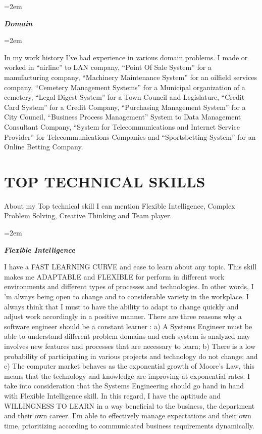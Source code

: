 \documentclass[paper=a4,fontsize=11pt]{scrartcl} %
\newlength{\spacebox}
\newcommand{\sepspace}{\vspace*{1em}}		%
\newcommand{\NewPart}[1]{\section*{\uppercase{#1}}}
\newcommand{\PersonalEntry}[2]{
		\noindent\hangindent=2em\hangafter=0 %
		\parbox{\spacebox}{        %
		\textit{#1}}		       %
		\hspace{1.5em} #2 \par}    %
\newcommand{\SkillsEntry}[2]{      %
		\noindent\hangindent=2em\hangafter=0 %
		\parbox{\spacebox}{        %
		\textit{#1}}			   %
		\hspace{1.5em} #2 \par}    %
\begin{document}
\sepspace

\SkillsEntry{\large{\textbf{Domain}}}{}
\SkillsEntry{}{
	In my work history I've had experience in various domain problems. I made or worked in “airline” to LAN company, “Point Of Sale System” for a manufacturing company, “Machinery Maintenance System” for an oilfield services company, “Cemetery Management Systems” for a Municipal organization of a cemetery, “Legal Digest System” for a Town Council and Legislature, “Credit Card System” for a Credit Company, “Purchasing Management System” for a City Council,  “Business Process Management” System to Data Management Consultant Company, “System for Telecommunications and Internet Service Provider” for Telecommunications Companies and “Sportsbetting System” for an Online Betting Company.
}

\NewPart{Top Technical Skills}{
About my Top technical skill I can mention Flexible Intelligence, Complex Problem Solving, Creative Thinking and Team player.
}

\sepspace

\SkillsEntry{\large{\textbf{Flexible Intelligence}}}{
I have a FAST LEARNING CURVE and ease to learn about any topic. This skill makes me ADAPTABLE and FLEXIBLE for perform in different work environments and different types of processes and technologies. In other words, I 'm always being open to change and to considerable variety in the workplace. I always think that I must to have the ability to adapt to change quickly and adjust work accordingly in a positive manner. There are three reasons why a software engineer should be a constant learner : a) A Systems Engineer must be able to understand different problem domains and each system is analyzed may involves new features and processes that are necessary to learn;  b) There is a low probability of participating in various projects and technology do not change; and c) The computer market behaves as the exponential growth of Moore's Law, this means that the technology and knowledge are improving at exponential rates. I take into consideration that the Systems Engineering should go hand in hand with Flexible Intelligence skill. In this regard, I have the aptitude and WILLINGNESS TO LEARN in a way beneficial to the business, the department and their own career. I'm able to effectively manage expectations and their own time, prioritizing according to communicated business requirements dynamically. 
}

\sepspace
\end{document}
